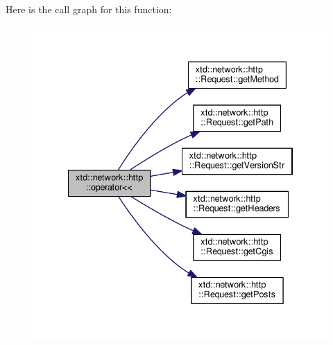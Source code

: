 Here is the call graph for this function\+:
\nopagebreak
\begin{figure}[H]
\begin{center}
\leavevmode
\includegraphics[width=334pt]{namespacextd_1_1network_1_1http_a9cd58530344372f236be8478d9c41ac3_cgraph}
\end{center}
\end{figure}


